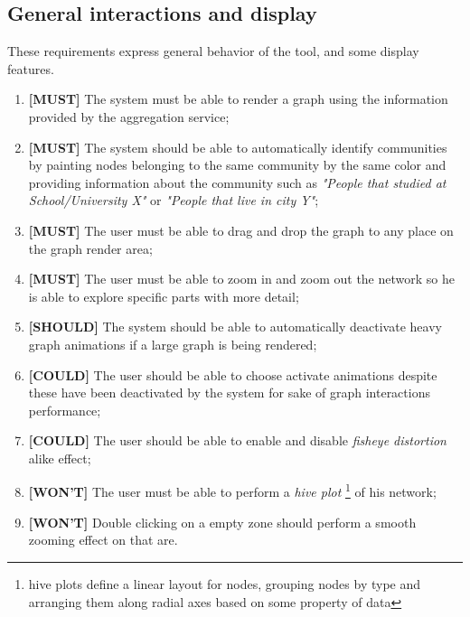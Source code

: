 
\subsection{General interactions and display}

These requirements express general behavior of the tool, and some display features.

\begin{enumerate}
    \item \textbf{[MUST]} The system must be able to render a graph using the information provided by the aggregation service;
    \item \textbf{[MUST]} The system should be able to automatically identify communities by painting nodes belonging to the same community by the same color and providing
    information about the community such as \textit{"People that studied at School/University X"} or \textit{"People that live in city Y"};
    \item \textbf{[MUST]} The user must be able to drag and drop the graph to any place on the graph render area;
    \item \textbf{[MUST]} The user must be able to zoom in and zoom out the network so he is able to explore specific parts with more detail;
    \item \textbf{[SHOULD]} The system should be able to automatically deactivate heavy graph animations if a large graph is being rendered;
    \item \textbf{[COULD]} The user should be able to choose activate animations despite these have been deactivated by the system for sake of graph interactions performance;
    \item \textbf{[COULD]} The user should be able to enable and disable \textit{fisheye distortion} alike effect; %
    \item \textbf{[WON'T]} The user must be able to perform a \textit{hive plot} \footnote{hive plots define a linear layout for nodes, grouping nodes by type and arranging them along radial axes based on some property of data} of his network;
    \item \textbf{[WON'T]} Double clicking on a empty zone should perform a smooth zooming effect on that are. %
\end{enumerate}

